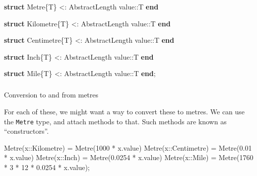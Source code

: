\documentclass[
]{article}
\makeatletter
\let\oldsubparagraph\subparagraph
\renewcommand{\subparagraph}{
    \@ifstar
      \xxxSubParagraphStar
      \xxxSubParagraphNoStar
  }
\newcommand{\xxxSubParagraphStar}[1]{\oldsubparagraph*{#1}\mbox{}}
\newcommand{\xxxSubParagraphNoStar}[1]{\oldsubparagraph{#1}\mbox{}}
\newenvironment{Shaded}{\begin{snugshade}}{\end{snugshade}}
\newcommand{\DataTypeTok}[1]{\textcolor[rgb]{0.68,0.00,0.00}{#1}}
\newcommand{\FloatTok}[1]{\textcolor[rgb]{0.68,0.00,0.00}{#1}}
\newcommand{\FunctionTok}[1]{\textcolor[rgb]{0.28,0.35,0.67}{#1}}
\newcommand{\KeywordTok}[1]{\textcolor[rgb]{0.00,0.23,0.31}{\textbf{#1}}}
\newcommand{\NormalTok}[1]{\textcolor[rgb]{0.00,0.23,0.31}{#1}}
\newcommand{\OperatorTok}[1]{\textcolor[rgb]{0.37,0.37,0.37}{#1}}
\makeatother
\begin{document}
\begin{Shaded}
\begin{Highlighting}[]
\KeywordTok{struct}\NormalTok{ Metre\{T\} }\OperatorTok{\textless{}:}\DataTypeTok{ AbstractLength}
\NormalTok{   value}\OperatorTok{::}\DataTypeTok{T}
\KeywordTok{end}

\KeywordTok{struct}\NormalTok{ Kilometre\{T\} }\OperatorTok{\textless{}:}\DataTypeTok{ AbstractLength}
\NormalTok{   value}\OperatorTok{::}\DataTypeTok{T}
\KeywordTok{end}

\KeywordTok{struct}\NormalTok{ Centimetre\{T\} }\OperatorTok{\textless{}:}\DataTypeTok{ AbstractLength}
\NormalTok{   value}\OperatorTok{::}\DataTypeTok{T}
\KeywordTok{end}

\KeywordTok{struct}\NormalTok{ Inch\{T\} }\OperatorTok{\textless{}:}\DataTypeTok{ AbstractLength}
\NormalTok{   value}\OperatorTok{::}\DataTypeTok{T}
\KeywordTok{end}

\KeywordTok{struct}\NormalTok{ Mile\{T\} }\OperatorTok{\textless{}:}\DataTypeTok{ AbstractLength}
\NormalTok{   value}\OperatorTok{::}\DataTypeTok{T}
\KeywordTok{end}\NormalTok{;}
\end{Highlighting}
\end{Shaded}

\subparagraph{Conversion to and from
metres}\label{conversion-to-and-from-metres}

For each of these, we might want a way to convert these to metres. We
can use the \texttt{Metre} type, and attach methods to that. Such
methods are known as ``constructors''.

\begin{Shaded}
\begin{Highlighting}[]
\FunctionTok{Metre}\NormalTok{(x}\OperatorTok{::}\DataTypeTok{Kilometre}\NormalTok{) }\OperatorTok{=} \FunctionTok{Metre}\NormalTok{(}\FloatTok{1000} \OperatorTok{*}\NormalTok{ x.value)}
\FunctionTok{Metre}\NormalTok{(x}\OperatorTok{::}\DataTypeTok{Centimetre}\NormalTok{) }\OperatorTok{=} \FunctionTok{Metre}\NormalTok{(}\FloatTok{0.01} \OperatorTok{*}\NormalTok{ x.value)}
\FunctionTok{Metre}\NormalTok{(x}\OperatorTok{::}\DataTypeTok{Inch}\NormalTok{) }\OperatorTok{=} \FunctionTok{Metre}\NormalTok{(}\FloatTok{0.0254} \OperatorTok{*}\NormalTok{ x.value)}
\FunctionTok{Metre}\NormalTok{(x}\OperatorTok{::}\DataTypeTok{Mile}\NormalTok{) }\OperatorTok{=} \FunctionTok{Metre}\NormalTok{(}\FloatTok{1760} \OperatorTok{*} \FloatTok{3} \OperatorTok{*} \FloatTok{12} \OperatorTok{*} \FloatTok{0.0254} \OperatorTok{*}\NormalTok{ x.value);}
\end{Highlighting}
\end{Shaded}
\end{document}
